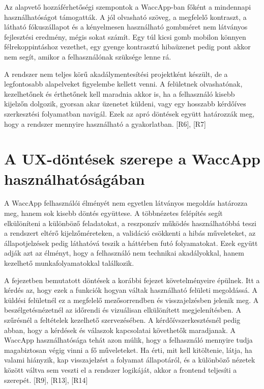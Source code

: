 Az alapvető hozzáférhetőségi szempontok a WaccApp-ban főként a mindennapi használhatóságot támogatták. A jól olvasható szöveg, a megfelelő kontraszt, a látható fókuszállapot és a kényelmesen használható gombméret nem látványos fejlesztési eredmény, mégis sokat számít. Egy túl kicsi gomb mobilon könnyen félrekoppintáshoz vezethet, egy gyenge kontrasztú hibaüzenet pedig pont akkor nem segít, amikor a felhasználónak szüksége lenne rá.

A rendszer nem teljes körű akadálymentesítési projektként készült, de a legfontosabb alapelveket figyelembe kellett venni. A felületnek olvashatónak, kezelhetőnek és érthetőnek kell maradnia akkor is, ha a felhasználó kisebb kijelzőn dolgozik, gyorsan akar üzenetet küldeni, vagy egy hosszabb kérdőíves szerkesztési folyamatban navigál. Ezek az apró döntések együtt határozzák meg, hogy a rendszer mennyire használható a gyakorlatban. [R6], [R7]

\section{A UX-döntések szerepe a WaccApp használhatóságában}

A WaccApp felhasználói élményét nem egyetlen látványos megoldás határozza meg, hanem sok kisebb döntés együttese. A többnézetes felépítés segít elkülöníteni a különböző feladatokat, a reszponzív működés használhatóbbá teszi a rendszert eltérő kijelzőméreteken, a validáció csökkenti a hibás műveleteket, az állapotjelzések pedig láthatóvá teszik a háttérben futó folyamatokat. Ezek együtt adják azt az élményt, hogy a felhasználó nem technikai akadályokkal, hanem kezelhető munkafolyamatokkal találkozik.

A fejezetben bemutatott döntések a korábbi fejezet követelményeire épülnek. Itt a kérdés az, hogy ezek a funkciók hogyan váltak használható felületi megoldássá. A küldési felületnél ez a megfelelő mezősorrendben és visszajelzésben jelenik meg. A beszélgetésnézetnél az időrendi és vizuálisan elkülönített megjelenítésben. A szűrésnél a feltételek kezelhető szervezésében. A kérdőívszerkesztésnél pedig abban, hogy a kérdések és válaszok kapcsolatai követhetők maradjanak. A WaccApp használhatósága tehát azon múlik, hogy a felhasználó mennyire tudja magabiztosan végig vinni a fő műveleteket. Ha érti, mit kell kitöltenie, látja, ha valami hiányzik, kap visszajelzést a folyamat állapotáról, és a különböző nézetek között váltva sem veszti el a rendszer logikáját, akkor a frontend teljesíti a szerepét. [R9], [R13], [R14]
